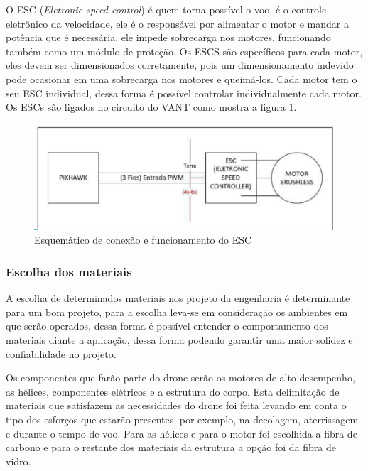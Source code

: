 O ESC (\textit{Eletronic speed control}) é quem torna possível o voo, é o controle eletrônico da velocidade, ele é o responsável por 
alimentar o motor e mandar a potência que é necessária, ele impede sobrecarga nos motores, funcionando também como um módulo de proteção. 
Os ESCS são específicos para cada motor, eles devem ser dimensionados corretamente, pois um dimensionamento indevido pode ocasionar em uma 
sobrecarga nos motores e queimá-los.  Cada motor tem o seu ESC individual, dessa forma é possível controlar individualmente cada motor. Os 
ESCs são ligados no circuito do VANT como mostra a figura \ref{fig:diagramaEstru}.
 

\begin{figure}[H]
    \centering
      \includegraphics[keepaspectratio=true,scale=0.5]{figuras/elice.eps}
     \caption{Esquemático  de conexão e funcionamento  do ESC\cite{dji}}
    \label{fig:diagramaEstru}
\end{figure}

\subsubsection{Escolha dos materiais}

A escolha de determinados materiais nos projeto da engenharia é determinante para um bom projeto, para a escolha leva-se em  consideração 
os ambientes em que serão operados, dessa forma é possível entender o comportamento dos materiais diante a aplicação, dessa forma podendo 
garantir uma maior solidez e confiabilidade no projeto.

Os componentes que farão parte do drone serão os motores de alto desempenho, as hélices, componentes elétricos e a estrutura do corpo. 
Esta delimitação de materiais que satisfazem as necessidades do drone foi feita levando  em conta o tipo dos esforços que estarão  presentes,  
por exemplo, na decolagem, aterrissagem  e durante o tempo  de voo. Para as hélices e para  o motor foi escolhida  a fibra de carbono  e
para  o restante dos materiais da estrutura a opção foi da fibra de vidro.

